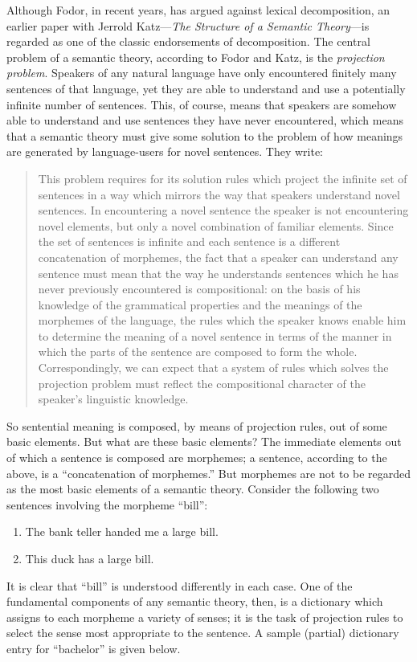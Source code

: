 \documentclass[12pt]{amsart}
\begin{document}
Although Fodor, in recent years, has argued against lexical decomposition, an earlier paper with Jerrold Katz---\emph{The Structure of a Semantic Theory}---is regarded as one of the classic endorsements of decomposition. The central problem of a semantic theory, according to Fodor and Katz, is the \emph{projection problem}. Speakers of any natural language have only encountered finitely many sentences of that language, yet they are able to understand and use a potentially infinite number of sentences. This, of course, means that speakers are somehow able to understand and use sentences they have never encountered, which means that a semantic theory must give some solution to the problem of how meanings are generated by language-users for novel sentences. They write:
\begin{quote}
This problem requires for its solution rules which project the infinite set of sentences in a way which mirrors the way that speakers understand novel sentences. In encountering a novel sentence the speaker is not encountering novel elements, but only a novel combination of familiar elements. Since the set of sentences is infinite and each sentence is a different concatenation of morphemes, the fact that a speaker can understand any sentence must mean that the way he understands sentences which he has never previously encountered is compositional: on the basis of his knowledge of the grammatical properties and the meanings of the morphemes of the language, the rules which the speaker knows enable him to determine the meaning of a novel sentence in terms of the manner in which the parts of the sentence are composed to form the whole. Correspondingly, we can expect that a system of rules which solves the projection problem must reflect the compositional character of the speaker's linguistic knowledge.
\end{quote}

So sentential meaning is composed, by means of projection rules, out of some basic elements. But what are these basic elements? The immediate elements out of which a sentence is composed are morphemes; a sentence, according to the above, is a ``concatenation of morphemes.'' But morphemes are not to be regarded as the most basic elements of a semantic theory. Consider the following two sentences involving the morpheme ``bill'':
\begin{enumerate}
\item The bank teller handed me a large bill.
\item This duck has a large bill.
\end{enumerate}
It is clear that ``bill'' is understood differently in each case. One of the fundamental components of any semantic theory, then, is a dictionary which assigns to each morpheme a variety of senses; it is the task of projection rules to select the sense most appropriate to the sentence. A sample (partial) dictionary entry for ``bachelor'' is given below.
\end{document}
